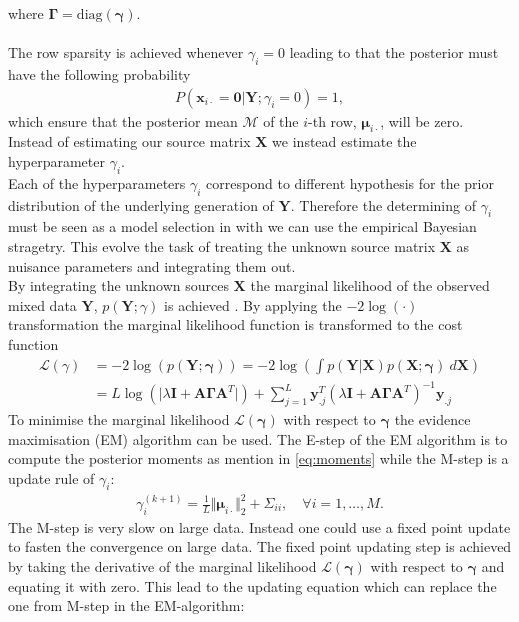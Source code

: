 where $\boldsymbol{\Gamma} = \text{diag}(\boldsymbol{\gamma})$. 
\\ \\
The row sparsity is achieved whenever $\gamma_i = 0$ leading to that the posterior must have the following probability
\begin{align*}
P(\mathbf{x}_{i \cdot} = \mathbf{0} \vert \mathbf{Y} ; \gamma_i = 0) = 1,
\end{align*}
which ensure that the posterior mean $\mathcal{M}$ of the $i$-th row, $\boldsymbol{\mu}_{i \cdot}$, will be zero. Instead of estimating our source matrix $\mathbf{X}$ we instead estimate the hyperparameter $\gamma_i$.
\\
Each of the hyperparameters $\gamma_i$ correspond to different hypothesis for the prior distribution of the underlying generation of $\mathbf{Y}$. Therefore the determining of $\gamma_i$ must be seen as a model selection in with we can use the empirical Bayesian stragetry. This evolve the task of treating the unknown source matrix $\mathbf{X}$ as nuisance parameters and integrating them out.
\\
By integrating the unknown sources $\mathbf{X}$ the marginal likelihood of the observed mixed data $\mathbf{Y}$, $p (\mathbf{Y} ; \gamma)$ is achieved \cite[p. 146]{??}. By applying the $-2 \log (\cdot)$ transformation the marginal likelihood function is transformed to the cost function
\begin{align*}
\mathcal{L}(\gamma) &= - 2 \log(p (\mathbf{Y} ; \boldsymbol{\gamma})) = -2 \log \left( \int p (\mathbf{Y}  \vert \mathbf{X}) p (\mathbf{X} ; \boldsymbol{\gamma}) \ d\mathbf{X} \right) \\
&= L \log ( \vert \lambda \mathbf{I} + \mathbf{A} \boldsymbol{\Gamma} \mathbf{A}^T \vert) + \sum_{j=1}^L \mathbf{y}_{.j}^T \left( \lambda \mathbf{I} + \mathbf{A} \boldsymbol{\Gamma} \mathbf{A}^T\right)^{-1} \mathbf{y}_{.j}
\end{align*}
To minimise the marginal likelihood $\mathcal{L}(\boldsymbol{\gamma})$ with respect to $\boldsymbol{\gamma}$ the evidence maximisation (EM) algorithm can be used. The E-step of the EM algorithm is to compute the posterior moments as mention in \eqref{eq:moments} while the M-step is a update rule of $\gamma_i$:
\begin{align*}
\gamma_i^{(k+1)} = \frac{1}{L} \Vert \boldsymbol{\mu}_{i \cdot} \Vert_2^2 + \Sigma_{ii}, \quad \forall i = 1, \dots, M.
\end{align*}
The M-step is very slow on large data. Instead one could use a fixed point update to fasten the convergence on large data. The fixed point updating step is achieved by taking the derivative of the marginal likelihood $\mathcal{L}(\boldsymbol{\gamma})$ with respect to $\boldsymbol{\gamma}$ and equating it with zero. This lead to the updating equation which can replace the one from M-step in the EM-algorithm:
